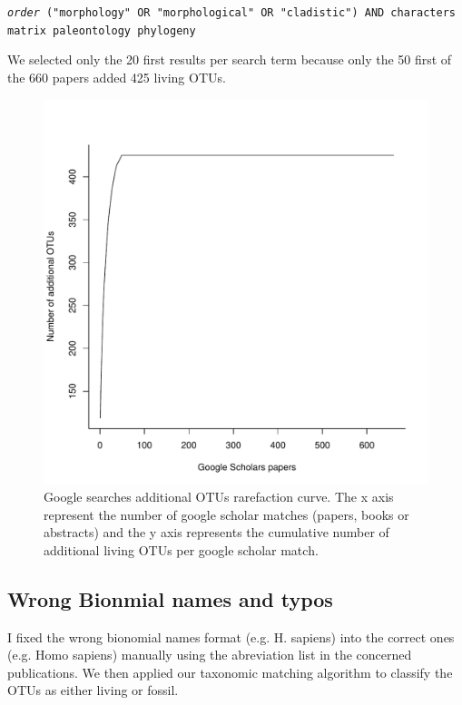\texttt{\textit{order} ("morphology" OR "morphological" OR "cladistic") AND characters matrix paleontology phylogeny}

We selected only the 20 first results per search term because only the 50 first of the 660 papers added 425 living OTUs.

\begin{figure}[!htbp]
\centering
    \includegraphics[width=1\textwidth]{Supplementary/Supp_figure_google_searches.pdf}
\caption{Google searches additional OTUs rarefaction curve. The x axis represent the number of google scholar matches (papers, books or abstracts) and the y axis represents the cumulative number of additional living OTUs per google scholar match.}
\label{Supp_figure_google_searches}
\end{figure}


\subsection{Wrong Bionmial names and typos}
I fixed the wrong bionomial names format (e.g. H. sapiens) into the correct ones (e.g. Homo sapiens) manually using the abreviation list in the concerned publications. We then applied our taxonomic matching algorithm to classify the OTUs as either living or fossil.

